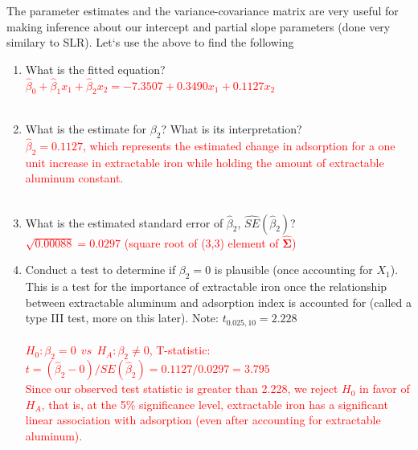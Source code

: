 The parameter estimates and the variance-covariance matrix are very useful for making inference about our intercept and partial slope parameters (done very similary to SLR).  Let`s use the above to find the following
\begin{enumerate}
\item What is the fitted equation?%
\textcolor{red}{\\$\hat{\beta}_0+\hat{\beta}_1x_1+\hat{\beta}_2x_2=-7.3507+0.3490x_1+0.1127x_2$\\~\\}
\item What is the estimate for $\beta_2$?  What is its interpretation?%
\textcolor{red}{\\$\hat\beta_2 =0.1127$, which represents the estimated change in adsorption for a one unit increase in extractable iron while holding the amount of extractable aluminum constant.\\~\\}
\item What is the estimated standard error of $\hat\beta_2$, $\hat{SE}(\hat\beta_2)$?  %
\textcolor{red}{\\$\sqrt{0.00088}=0.0297$ (square root of (3,3) element of $\widehat{\boldsymbol{\Sigma}}$)\\}
\item Conduct a test to determine if $\beta_2=0$ is plausible (once accounting for $X_1$).  This is a test for the importance of extractable iron once the relationship between extractable aluminum and adsorption index is accounted for (called a type III test, more on this later).  Note: $t_{0.025, 10}=2.228$\\
\textcolor{red}{\\$H_0: \beta_2=0 ~~ vs ~~ H_A: \beta_2\ne 0$, T-statistic: $t=(\hat\beta_2 - 0)/SE(\hat\beta_2) = 0.1127/0.0297 = 3.795$ \\
Since our observed test statistic is greater than 2.228, we reject $H_0$ in favor of $H_A$, that is, at the 5\% significance level, extractable iron has a significant linear association with adsorption (even after accounting for extractable aluminum).}
\end{enumerate}


